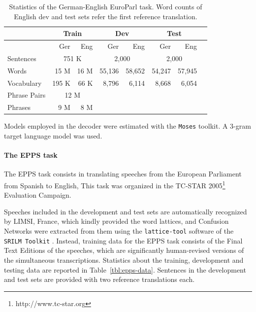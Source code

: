 \documentclass[10pt]{report}
\theoremstyle{plain}
\begin{document}
{\begin{table}[th]
\begin{center}
\begin{tabular}{lrr|rr|rrr}
        &  \multicolumn{2}{c|}{Train}   &  \multicolumn{2}{c|}{Dev}    &  \multicolumn{2}{c}{Test}\\
 \hline
        &  Ger   &   Eng  &  Ger   &   Eng  &  Ger   &   Eng     \\
 \hline
Sentences    & \multicolumn{2}{c|}{751 K} & \multicolumn{2}{c|}{2,000} & \multicolumn{2}{c}{2,000}\\
Words & 15 M & 16 M & 55,136 & 58,652 & 54,247 & 57,945\\
Vocabulary  & 195 K & 66 K & 8,796 & 6,114& 8,668 & 6,054&\\
Phrase Pairs  & \multicolumn{2}{c|}{12 M}\\
Phrases & 9 M & 8 M \\
\end{tabular}
\caption{Statistics of the German-English EuroParl task. Word counts of  English dev and test sets refer
 the first reference translation. }
\begin{center}
\end{center}
\label{tbl:ge-en-europarl-data}
\end{center}
\end{table}

Models employed in the decoder were estimated with the {\tt Moses} toolkit. A 3-gram target language model was used.

\paragraph{The EPPS task}
\label{sec:epps-task}
The EPPS task consists in translating speeches from the  European Parliament  from Spanish to English, This task was organized in the TC-STAR 2005\footnote{http://www.tc-star.org} Evaluation Campaign. 

Speeches included in the development and test sets are automatically recognized by LIMSI, France, which kindly provided the word lattices, and Confusion Networks were extracted from them using the {\tt lattice-tool} software of the {\tt SRILM Toolkit} \cite{stolcke:02}. Instead, training data for the EPPS task consists of the Final Text Editions of the speeches, which are significantly human-revised versions of the simultaneous transcriptions.
Statistics about the training, development and testing  data are reported in Table~\ref{tbl:epps-data}.  
Sentences in the development and test sets are provided with two reference translations each.  


}
\end{document}
